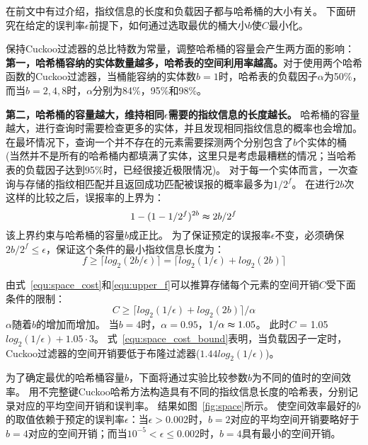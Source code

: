 在前文中有过介绍，指纹信息的长度和负载因子都与哈希桶的大小有关。
下面研究在给定的误判率$\epsilon$前提下，如何通过选取最优的桶大小$b$使$C$最小化。

保持Cuckoo过滤器的总比特数为常量，调整哈希桶的容量会产生两方面的影响：
\textbf{第一，哈希桶容纳的实体数量越多，哈希表的空间利用率越高。}对于使用两个哈希函数的Cuckoo过滤器，当桶能容纳的实体数$b = 1$时，哈希表的负载因子$\alpha$为50\%，
而当$b = 2,4,8$时，$\alpha$分别为84\%，95\%和98\%。

\textbf{第二，哈希桶的容量越大，维持相同$\epsilon$需要的指纹信息的长度越长。}
哈希桶的容量越大，进行查询时需要检查更多的实体，并且发现相同指纹信息的概率也会增加。
在最坏情况下，查询一个并不存在的元素需要探测两个分别包含了$b$个实体的桶
(当然并不是所有的哈希桶内都填满了实体，这里只是考虑最糟糕的情况；当哈希表的负载因子达到95\%时，已经很接近极限情况)。
对于每一个实体而言，一次查询与存储的指纹相匹配并且返回成功匹配被误报的概率最多为${1/2^f}$。
在进行$2b$次这样的比较之后，误报率的上界为：
\begin{equation}
1 - (1 - {1/2^f})^{2b} \thickapprox {2b/2^f}
\end{equation}
该上界约束与哈希桶的容量$b$成正比。
为了保证预定的误报率$\epsilon$不变，必须确保${2b/2^f}\leq \epsilon$，保证这个条件的最小指纹信息长度为：
\begin{equation}
f \geq \lceil log_2({2b/\epsilon})\rceil = \lceil log_2({1/\epsilon}) + log_2(2b)\rceil  
\label{equ:upper_f}
\end{equation}

由式~\ref{equ:space_cost}和\ref{equ:upper_f}可以推算存储每个元素的空间开销$C$受下面条件的限制：
\begin{equation}
C \geq {\lceil log_2({1/\epsilon}) + log_2(2b)\rceil /\alpha}
\label{equ:space_cost_bound}
\end{equation}
$\alpha$随着$b$的增加而增加。
当$b = 4$时，$\alpha = 0.95$，${1/\alpha} \thickapprox 1.05$。
此时$C$ = 1.05$log_2({1/\epsilon}) + 1.05\cdot 3$。
式~\ref{equ:space_cost_bound}表明，当负载因子一定时，Cuckoo过滤器的空间开销要低于布隆过滤器($1.44log_2({1/\epsilon})$)。

为了确定最优的哈希桶容量$b$，下面将通过实验比较参数$b$为不同的值时的空间效率。
用不完整键Cuckoo哈希方法构造具有不同的指纹信息长度的哈希表，分别记录对应的平均空间开销和误判率。
结果如图~\ref{fig:space}所示。
使空间效率最好的$b$的取值依赖于预定的误判率$\epsilon$：当$\epsilon > 0.002 $时，$b = 2$对应的平均空间开销要略好于$b = 4$对应的空间开销；而当$ 10^{-5} < \epsilon \leq 0.002$时，$b = 4$具有最小的空间开销。

